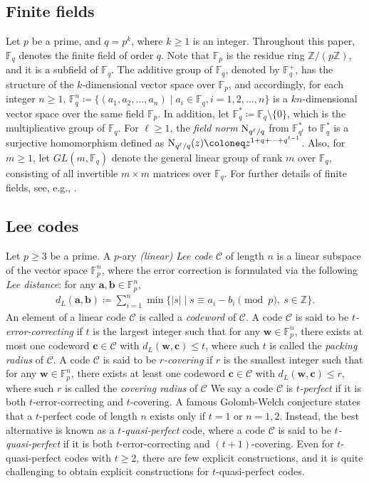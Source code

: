 \documentclass{amsart}
\numberwithin{equation}{section}
\newcommand{\F}{\mathbb{F}}
\begin{document}
\subsection{Finite fields}
Let $p$ be a prime, and $q=p^k$, where $k\geq 1$ is an integer.
Throughout this paper, $\F_q$ denotes the finite field of order $q$.
Note that $\F_p$ is the residue ring $\mathbb{Z}/(p\mathbb{Z})$, and it
is a subfield of $\F_q$.
The additive group of $\F_q$, denoted by $\F_q^+$, has the structure of the $k$-dimensional vector space over $\F_p$, and accordingly, for each integer $n\geq 1$,  $\F_q^n\coloneq \{(a_1, a_2, \ldots, a_n) \mid a_i \in \F_q, i=1,2,\ldots, n\}$ is a $kn$-dimensional vector space over the same field $\F_p$.
In addition, let $\F_q^*\coloneq \F_q \setminus \{0\}$, which is the multiplicative group of $\F_q$.
For $\ell \geq 1$, the {\it field norm} ${\rm N}_{q^\ell/q}$ from $\F_{q^\ell}^*$ to $\F_q^*$ is a surjective homomorphism defined as ${\rm N}_{q^\ell/q}(z)\coloneq z^{1+q+\cdots+q^{\ell-1}}$.
Also, for $m \geq 1$, let $GL(m,\F_q)$ denote the general linear group of rank $m$ over $\F_q$,  consisting of all invertible $m\times m$ matrices over $\F_q$.  
For further details of finite fields, see, e.g., \cite{LN1983}.

\subsection{Lee codes}
Let $p\geq 3$ be a prime.
A $p$-ary {\it (linear) Lee code} $\mathcal{C}$ of length $n$ is a linear subspace of the vector space $\F_p^n$, where the error correction is formulated via the following {\it Lee distance}: for any $\mathbf{a}, \mathbf{b} \in \F_p^n$,
\begin{align*}
    d_{L}(\mathbf{a}, \mathbf{b})\coloneq \sum_{i=1}^n\min\{|s| \mid s \equiv a_i-b_i \pmod{p},\: s \in \mathbb{Z}\}.
\end{align*}
An element of a linear code $\mathcal{C}$ is called a {\it codeword} of $\mathcal{C}$.
A code $\mathcal{C}$ is said to be {\it $t$-error-correcting} if $t$ is the largest integer such that for any $\mathbf{w} \in \F_p^n$, there exists at most one codeword $\mathbf{c} \in \mathcal{C}$ with $d_L(\mathbf{w},\mathbf{c}) \leq t$, where such $t$ is called the {\it
packing radius} of $\mathcal{C}$. A code $\mathcal{C}$ is said to be {\it $r$-covering} if $r$ is the smallest integer such that for any $\mathbf{w} \in \F_p^n$, there exists at least one codeword $\mathbf{c} \in \mathcal{C}$ with $d_L(\mathbf{w},\mathbf{c}) \leq r$, where such $r$ is called the {\it covering radius} of $\mathcal{C}$
We say a code $\mathcal{C}$ is {\it $t$-perfect} if it is both $t$-error-correcting and $t$-covering.
A famous Golomb-Welch conjecture states that a $t$-perfect code of length $n$ exists only if $t=1$ or $n=1,2$.
Instead, the best alternative is known as a {\it $t$-quasi-perfect} code, where a code $\mathcal{C}$ is said to be {\it $t$-quasi-perfect} if it is both $t$-error-correcting and $(t+1)$-covering.
Even for $t$-quasi-perfect codes with $t\geq 2$, there are few explicit constructions, and it is quite challenging to obtain explicit constructions for $t$-quasi-perfect codes.
\end{document}
